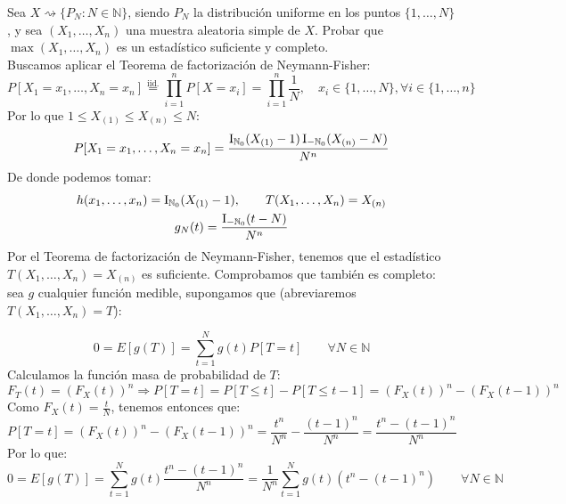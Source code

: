 \begin{ejercicio}\label{ej:3.5}
    Sea $X\rightsquigarrow\{P_N : N\in \mathbb{N}\}$, siendo $P_N$ la distribución uniforme en los puntos $\{1,\ldots,N\}$, y sea $(X_1, \ldots, X_n)$ una muestra aleatoria simple de $X$. Probar que $\max(X_1, \ldots, X_n)$ es un estadístico suficiente y completo.\\

    \noindent
    Buscamos aplicar el Teorema de factorización de Neymann-Fisher:
    \begin{equation*}
        P[X_1 = x_1, \ldots, X_n = x_n] \stackrel{\text{iid.}}{=} \prod_{i=1}^{n}P[X=x_i] =  \prod_{i=1}^{n} \dfrac{1}{N}, \quad x_i \in \{1,\ldots, N\}, \forall i \in \{1,\ldots,n\}
    \end{equation*}
    Por lo que $1\leq X_{(1)} \leq X_{(n)} \leq N$:
    \begin{equation*}
        P[X_1 = x_1, \ldots, X_n=x_n] = \dfrac{\operatorname{I}_{\mathbb{N}_0}(X_{(1)}-1)\operatorname{I}_{-\mathbb{N}_0}(X_{(n)}-N)}{N^n}
    \end{equation*}
    De donde podemos tomar:
    \begin{gather*}
        h(x_1, \ldots, x_n) = \operatorname{I}_{\mathbb{N}_0}(X_{(1)}-1), \qquad T(X_1, \ldots, X_n) = X_{(n)} \\ 
        g_N(t) = \dfrac{\operatorname{I}_{-\mathbb{N}_0}(t-N)}{N^n}
    \end{gather*}
    Por el Teorema de factorización de Neymann-Fisher, tenemos que el estadístico $T(X_1, \ldots, X_n) = X_{(n)}$ es suficiente. Comprobamos que también es completo: sea $g$ cualquier función medible, supongamos que (abreviaremos $T(X_1, \ldots, X_n) = T$):

    \begin{equation*}
        0 = E[g(T)] = \sum_{t=1}^{N}g(t)P[T=t] \qquad \forall N\in \mathbb{N}
    \end{equation*}
    Calculamos la función masa de probabilidad de $T$:
    \begin{equation*}
        F_T(t) = {(F_X(t))}^{n} \Longrightarrow P[T=t] = P[T\leq t] - P[T\leq t-1] = {(F_X(t))}^{n} - {(F_X(t-1))}^{n}
    \end{equation*}
    Como $F_X(t) = \frac{t}{N}$, tenemos entonces que:
    \begin{equation*}
        P[T=t] = {(F_X(t))}^{n} - {(F_X(t-1))}^{n} = \dfrac{t^n}{N^n} - \dfrac{{(t-1)}^{n}}{N^n} = \dfrac{t^n - {(t-1)}^{n}}{N^n}
    \end{equation*}
    Por lo que:
    \begin{equation*}
        0 = E[g(T)] = \sum_{t=1}^{N} g(t) \dfrac{t^n -{(t-1)}^{n}}{N^n} = \dfrac{1}{N^n} \sum_{t=1}^{N} g(t) (t^n - {(t-1)}^{n}) \qquad \forall N\in \mathbb{N}
    \end{equation*}


\end{ejercicio}
